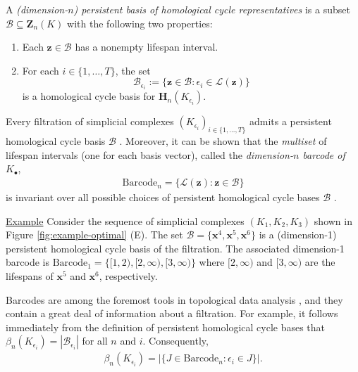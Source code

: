 \documentclass[utf8]{formatting_stuff/frontiersFPHY}
\newcommand{\Homologies}[0]{\mathbf{H}}
\newcommand{\Cycles}[0]{\mathbf{Z}}
\newcommand{\optimalrep}{\mathbf{x}}
\newcommand{\cycle}{{\mathbf z}}
\newcommand{\barcode}{\mathrm{Barcode}}
\newcommand{\persinterval}{\mathcal{L}}
\newcommand{\interval}{J}
\newcommand{\hcyclebasis}{\mathcal B}
\theoremstyle{plain}
\theoremstyle{definition}
\begin{document}
A \emph{(dimension-$n$) persistent basis of  homological cycle representatives} is a subset $\hcyclebasis \subseteq \Cycles_n(K)$ with the following two properties:
    \begin{enumerate}
    \item Each $\cycle \in \hcyclebasis$ has a nonempty lifespan interval.
    \item For each $i \in \{1, \ldots, T\}$, the set 
        $$
        \hcyclebasis_{\epsilon_i} 
        := 
        \{\cycle \in \hcyclebasis : \epsilon_i \in \persinterval(\cycle) \}
        $$
    is a homological cycle basis for $\Homologies_n(K_{\epsilon_i})$.
    \end{enumerate}
 
 
Every filtration of simplicial complexes $ (K_{\epsilon_i})_{i \in\{ 1, \ldots, T\}}$ admits a  persistent homological cycle basis  $\hcyclebasis$ \cite{zomorodiancarlssoncomputingph}.  
Moreover, it can be shown that the \emph{multiset} of lifespan intervals (one for each basis vector), called the \emph{dimension-$n$ barcode of $K_\bullet$},
    \begin{align*}
        \barcode_n = 
        \{ \persinterval(\cycle) : \cycle \in \hcyclebasis \}
    \end{align*}
is invariant over all possible choices of persistent homological cycle bases $\hcyclebasis$ \cite{zomorodiancarlssoncomputingph}.  

\noindent \underline{Example}  Consider the sequence of simplicial complexes $(K_1, K_2, K_3)$ shown in Figure \ref{fig:example-optimal} (E).  The set
    $
        \hcyclebasis = \{\optimalrep^4, \optimalrep^5, \optimalrep^6 \}
    $
is a (dimension-1) persistent homological cycle basis of the filtration.  The associated dimension-1 barcode is     
    $
    \barcode_1 = \{[1,2), [2,\infty), [3, \infty) \} 
    $ 
where $[2,\infty)$ and $[3,\infty)$ are the lifespans of  $\optimalrep^5$ and $\optimalrep^6$, respectively.

Barcodes are among the foremost tools in topological data analysis \cite{barcodeGhrist,  persistenthomologyasurvey}, and they contain a great deal of information about a filtration.  For example, it follows  immediately from the definition of persistent homological cycle bases  that
    $
        \beta_n(K_{\epsilon_i})
        =
        |\hcyclebasis_{\epsilon_i}|
    $
for all $n$ and $i$.  Consequently,
    \begin{align*}
        \beta_n(K_{\epsilon_i})
        =
        |\{\interval \in \barcode_n : \epsilon_i \in \interval \}|.
    \end{align*}
\end{document}

